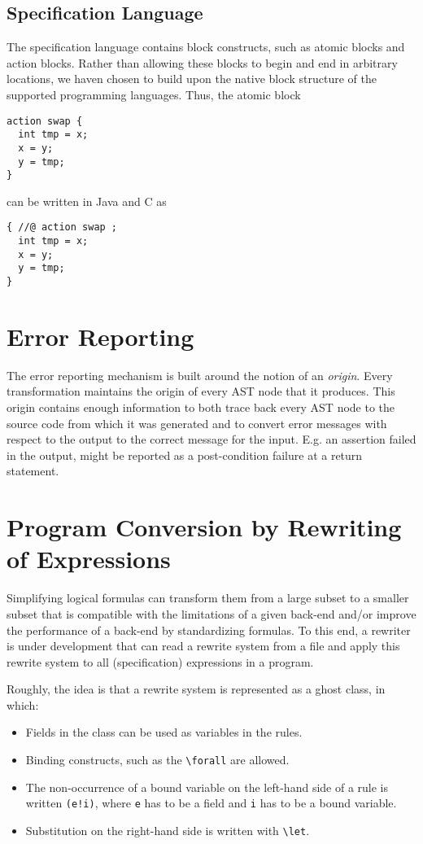 \documentclass{report}
\begin{document}
\section{Specification Language}

The specification language contains block constructs, such as atomic blocks and action blocks.
Rather than allowing these blocks to begin and end in arbitrary locations, we haven chosen to
build upon the native block structure of the supported programming languages. Thus, the atomic
block
\begin{lstlisting}
action swap {
  int tmp = x;
  x = y;
  y = tmp; 
}
\end{lstlisting}
can be written in Java and C as
\begin{lstlisting}
{ //@ action swap ;
  int tmp = x;
  x = y;
  y = tmp; 
}
\end{lstlisting}

\chapter{Error Reporting}

The error reporting mechanism is built around the notion of an \emph{origin}.
Every transformation maintains the origin of every AST node that it produces.
This origin contains enough information to both trace back every AST node
to the source code from which it was generated and to convert error
messages with respect to the output to the correct message for the input.
E.g. an assertion failed in the output, might be reported as a
post-condition failure at a return statement.

\chapter{Program Conversion by Rewriting of Expressions}

Simplifying logical formulas can transform them from a large subset to
a smaller subset that is compatible with the limitations of a given back-end
and/or improve the performance of a back-end by standardizing formulas.
To this end, a rewriter is under development that can read a rewrite system
from a file and apply this rewrite system to all (specification) expressions
in a program.

Roughly, the idea is that a rewrite system is represented as a ghost class,
in which:
\begin{itemize}
\item Fields in the class can be used as variables in the rules.
\item Binding constructs, such as the \lstinline+\forall+ are allowed.
\item The non-occurrence of a bound variable on the left-hand side of a rule
is written \lstinline+(e!i)+, where \lstinline+e+ has to be a field and
\lstinline+i+ has to be a bound variable.
\item Substitution on the right-hand side is written with \lstinline+\let+.
\end{itemize}
\end{document}
